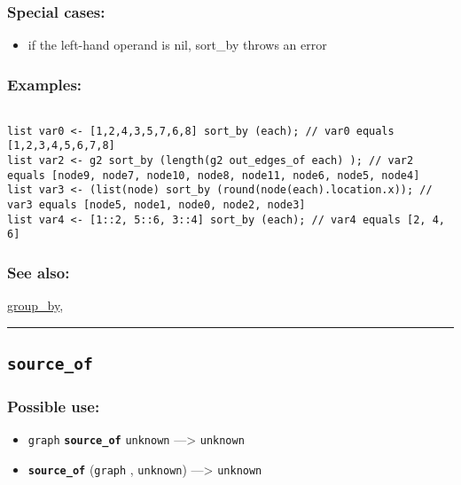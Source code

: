 \documentclass[]{book}
\providecommand{\tightlist}{%
  \setlength{\itemsep}{0pt}\setlength{\parskip}{0pt}}
\theoremstyle{definition}
\theoremstyle{definition}
\theoremstyle{definition}
\theoremstyle{remark}
\begin{document}
\subsubsection{Special cases:}\label{special-cases-124}

\begin{itemize}
\tightlist
\item
  if the left-hand operand is nil, sort\_by throws an error
\end{itemize}

\subsubsection{Examples:}\label{examples-339}

\begin{verbatim}
 
list var0 <- [1,2,4,3,5,7,6,8] sort_by (each); // var0 equals [1,2,3,4,5,6,7,8] 
list var2 <- g2 sort_by (length(g2 out_edges_of each) ); // var2 equals [node9, node7, node10, node8, node11, node6, node5, node4] 
list var3 <- (list(node) sort_by (round(node(each).location.x)); // var3 equals [node5, node1, node0, node2, node3] 
list var4 <- [1::2, 5::6, 3::4] sort_by (each); // var4 equals [2, 4, 6]
\end{verbatim}

\subsubsection{See also:}\label{see-also-188}

\href{OperatorsDH\#group_by}{group\_by},

\begin{center}\rule{0.5\linewidth}{\linethickness}\end{center}

\subsection{\texorpdfstring{\texttt{source\_of}}{source\_of}}\label{source_of}

\subsubsection{Possible use:}\label{possible-use-487}

\begin{itemize}
\tightlist
\item
  \texttt{graph} \textbf{\texttt{source\_of}} \texttt{unknown}
  ---\textgreater{} \texttt{unknown}
\item
  \textbf{\texttt{source\_of}} (\texttt{graph} , \texttt{unknown})
  ---\textgreater{} \texttt{unknown}
\end{itemize}
\end{document}
